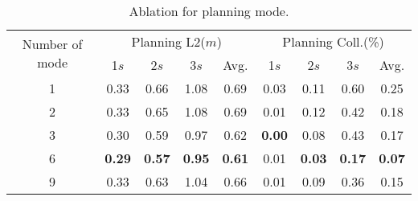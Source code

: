 \begin{table}[htbp]
\centering
\caption{Ablation for planning mode.}
\label{tab:ablation_planning_mode}
\vspace{5pt}
\scriptsize
{    
\begin{tabular}{c|cccc|cccc}
\toprule
\multirow{2}{*}{Number of mode} &
\multicolumn{4}{c|}{Planning L2($m$)} & 
\multicolumn{4}{c}{Planning Coll.(\%)} \\
& 1$s$ & 2$s$ & 3$s$ & \cellcolor{gray!30}Avg. & 1$s$ & 2$s$ & 3$s$ &\cellcolor{gray!30}Avg.\\
\midrule
1 & 0.33 & 0.66 & 1.08 &\cellcolor{gray!30}0.69 & 0.03 & 0.11 & 0.60 & \cellcolor{gray!30}0.25 \\
2 & 0.33 & 0.65 & 1.08 & \cellcolor{gray!30}0.69 & 0.01 & 0.12 & 0.42 & \cellcolor{gray!30}0.18 \\
3 & 0.30 & 0.59 & 0.97 & \cellcolor{gray!30}0.62 & \textbf{0.00} & 0.08 & 0.43 & \cellcolor{gray!30}0.17\\
6 & \textbf{0.29} & \textbf{0.57} & \textbf{0.95} & \cellcolor{gray!30}\textbf{0.61} & 0.01 & \textbf{0.03} & \textbf{0.17} & \cellcolor{gray!30}\textbf{0.07}\\
9 & 0.33 & 0.63 & 1.04 & \cellcolor{gray!30}0.66 & 0.01 & 0.09 & 0.36 & \cellcolor{gray!30}0.15\\
\bottomrule
\end{tabular}
}
\end{table} 